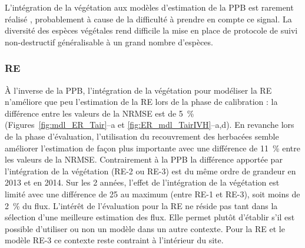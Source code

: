 L'intégration de la végétation aux modèles d'estimation de la PPB est rarement réalisé \citep{bortoluzzi2006a,gorres2014}, probablement à cause de la difficulté à prendre en compte ce signal.
La diversité des espèces végétales rend difficile la mise en place de protocole de suivi non-destructif généralisable à un grand nombre d'espèces.

%



\subsubsection{RE}

À l'inverse de la PPB, l'intégration de la végétation pour modéliser la RE n'améliore que peu l'estimation de la RE lors de la phase de calibration : la différence entre les valeurs de la NRMSE est de \SI{5}{\percent} (Figures~\ref{fig:mdl_ER_Tair}--a et \ref{fig:ER_mdl_TairIVH}--a,d).
En revanche lors de la phase d'évaluation, l'utilisation du recouvrement des herbacées semble améliorer l'estimation de façon plus importante avec une différence de \SI{11}{\percent} entre les valeurs de la NRMSE.
Contrairement à la PPB la différence apportée par l'intégration de la végétation (RE-2 ou RE-3) est du même ordre de grandeur en 2013 et en 2014.
Sur les 2 années, l'effet de l'intégration de la végétation est limité avec une différence de \SI{25}{\gcma} au maximum (entre RE-1 et RE-3), soit moins de \SI{2}{\percent} du flux.
L'intérêt de l'évaluation pour la RE ne réside pas tant dans la sélection d'une meilleure estimation des flux.
Elle permet plutôt d'établir s'il est possible d'utiliser ou non un modèle dans un autre contexte.
Pour la RE et le modèle RE-3 ce contexte reste contraint à l'intérieur du site.

